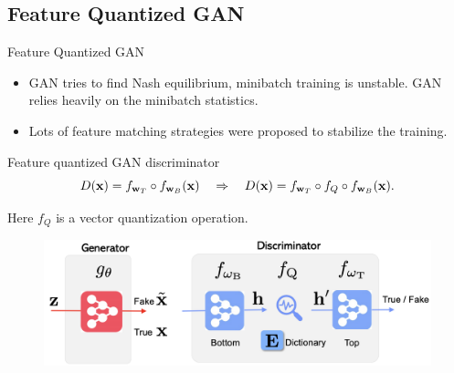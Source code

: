 \documentclass{beamer}
\begin{document}
\subsection{Feature Quantized GAN}
\begin{frame}{Feature Quantized GAN}
	\begin{itemize}
		\item GAN tries to find Nash equilibrium, minibatch training is unstable. GAN relies heavily on the minibatch statistics.
		\item Lots of feature matching strategies were proposed to stabilize the training. 
	\end{itemize}
	\begin{block}{Feature quantized GAN discriminator}
		\[
			D(\mathbf{x}) = f_{\mathbf{w}_T} \circ f_{\mathbf{w}_B}(\mathbf{x}) \quad \Rightarrow \quad D(\mathbf{x}) = f_{\mathbf{w}_T} \circ f_Q \circ f_{\mathbf{w}_B}(\mathbf{x}). 
		\]
	\end{block}
	Here $f_Q$ is a vector quantization operation.
	\begin{figure}
		\centering
		\includegraphics[width=0.7\linewidth]{figs/fqgan}
	\end{figure}
\end{frame}
\end{document}
